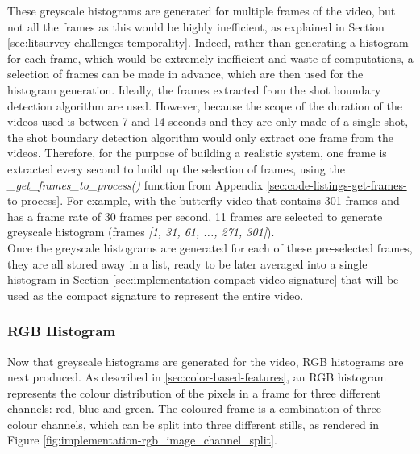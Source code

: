 These greyscale histograms are generated for multiple frames of the video, but not all the frames as this would be highly inefficient, as explained in Section \ref{sec:litsurvey-challenges-temporality}. Indeed, rather than generating a histogram for each frame, which would be extremely inefficient and waste of computations, a selection of frames can be made in advance, which are then used for the histogram generation. Ideally, the frames extracted from the shot boundary detection algorithm are used. However, because the scope of the duration of the videos used is between 7 and 14 seconds and they are only made of a single shot, the shot boundary detection algorithm would only extract one frame from the videos. Therefore, for the purpose of building a realistic system, one frame is extracted every second to build up the selection of frames, using the \textit{\_get\_frames\_to\_process()} function from Appendix \ref{sec:code-listings-get-frames-to-process}. For example, with the butterfly video that contains 301 frames and has a frame rate of 30 frames per second, 11 frames are selected to generate greyscale histogram (frames \textit{[1, 31, 61, ..., 271, 301]}).\\

Once the greyscale histograms are generated for each of these pre-selected frames, they are all stored away in a list, ready to be later averaged into a single histogram in Section \ref{sec:implementation-compact-video-signature} that will be used as the compact signature to represent the entire video.


\subsubsection{RGB Histogram}

Now that greyscale histograms are generated for the video, RGB histograms are next produced. As described in \ref{sec:color-based-features}, an RGB histogram represents the colour distribution of the pixels in a frame for three different channels: red, blue and green. The coloured frame is a combination of three colour channels, which can be split into three different stills, as rendered in Figure \ref{fig:implementation-rgb_image_channel_split}.\\

